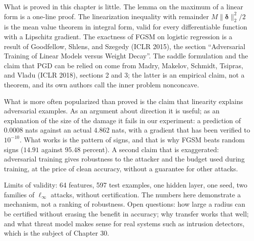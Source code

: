 \begin{untukpeneliti}
What is proved in this chapter is little. The lemma on the maximum of a linear form is
a one-line proof. The linearization inequality with remainder
$M\lVert\boldsymbol{\delta}\rVert_2^2/2$ is the mean value theorem in integral form,
valid for every differentiable function with a Lipschitz gradient. The exactness of
FGSM on logistic regression is a result of Goodfellow, Shlens, and Szegedy (ICLR 2015),
the section ``Adversarial Training of Linear Models versus Weight Decay''. The saddle
formulation and the claim that PGD can be relied on come from Madry, Makelov, Schmidt,
Tsipras, and Vladu (ICLR 2018), sections 2 and 3; the latter is an empirical claim,
not a theorem, and its own authors call the inner problem nonconcave.

What is more often popularized than proved is the claim that linearity explains
adversarial examples. As an argument about direction it is useful; as an explanation of
the size of the damage it fails in our experiment: a prediction of $0.0008$ nats
against an actual $4.862$ nats, with a gradient that has been verified to $10^{-10}$.
What works is the pattern of signs, and that is why FGSM beats random signs
($14.91$ against $95.48$ percent). A second claim that is exaggerated: adversarial
training gives robustness to the attacker and the budget used during training, at the
price of clean accuracy, without a guarantee for other attacks.

Limits of validity: 64 features, 597 test examples, one hidden layer, one seed, two
families of $\ell_\infty$ attacks, without certification. The numbers here demonstrate
a mechanism, not a ranking of robustness. Open questions: how large a radius can be
certified without erasing the benefit in accuracy; why transfer works that well;
and what threat model makes sense for real systems such as intrusion detectors, which
is the subject of Chapter 30.
\end{untukpeneliti}

